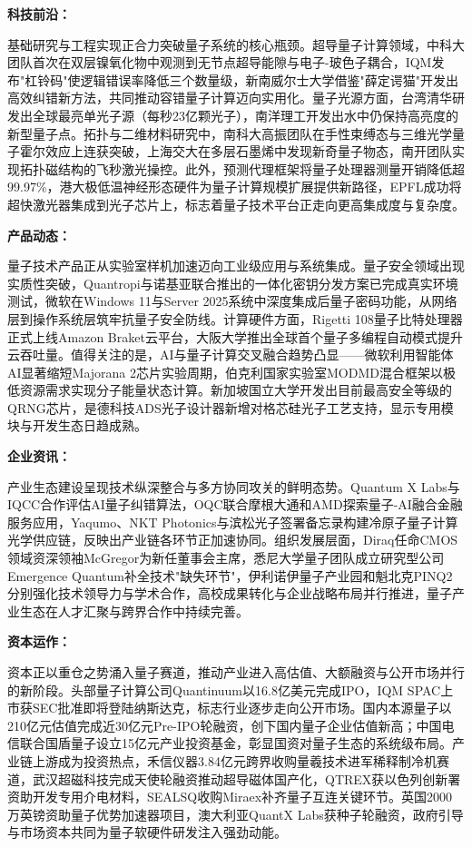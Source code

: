 \documentclass[12pt,a4paper]{ctexart}
\begin{document}
\textbf{ 科技前沿：}

基础研究与工程实现正合力突破量子系统的核心瓶颈。超导量子计算领域，中科大团队首次在双层镍氧化物中观测到无节点超导能隙与电子-玻色子耦合，IQM发布"杠铃码"使逻辑错误率降低三个数量级，新南威尔士大学借鉴"薛定谔猫"开发出高效纠错新方法，共同推动容错量子计算迈向实用化。量子光源方面，台湾清华研发出全球最亮单光子源（每秒23亿颗光子），南洋理工开发出水中仍保持高亮度的新型量子点。拓扑与二维材料研究中，南科大高振团队在手性束缚态与三维光学量子霍尔效应上连获突破，上海交大在多层石墨烯中发现新奇量子物态，南开团队实现拓扑磁结构的飞秒激光操控。此外，预测代理框架将量子处理器测量开销降低超99.97\%，港大极低温神经形态硬件为量子计算规模扩展提供新路径，EPFL成功将超快激光器集成到光子芯片上，标志着量子技术平台正走向更高集成度与复杂度。


\textbf{ 产品动态：}

量子技术产品正从实验室样机加速迈向工业级应用与系统集成。量子安全领域出现实质性突破，Quantropi与诺基亚联合推出的一体化密钥分发方案已完成真实环境测试，微软在Windows 11与Server 2025系统中深度集成后量子密码功能，从网络层到操作系统层筑牢抗量子安全防线。计算硬件方面，Rigetti 108量子比特处理器正式上线Amazon Braket云平台，大阪大学推出全球首个量子多编程自动模式提升云吞吐量。值得关注的是，AI与量子计算交叉融合趋势凸显——微软利用智能体AI显著缩短Majorana 2芯片实验周期，伯克利国家实验室MODMD混合框架以极低资源需求实现分子能量状态计算。新加坡国立大学开发出目前最高安全等级的QRNG芯片，是德科技ADS光子设计器新增对格芯硅光子工艺支持，显示专用模块与开发生态日趋成熟。


\textbf{ 企业资讯：}

产业生态建设呈现技术纵深整合与多方协同攻关的鲜明态势。Quantum X Labs与IQCC合作评估AI量子纠错算法，OQC联合摩根大通和AMD探索量子-AI融合金融服务应用，Yaqumo、NKT Photonics与滨松光子签署备忘录构建冷原子量子计算光学供应链，反映出产业链各环节正加速协同。组织发展层面，Diraq任命CMOS领域资深领袖McGregor为新任董事会主席，悉尼大学量子团队成立研究型公司Emergence Quantum补全技术"缺失环节"，伊利诺伊量子产业园和魁北克PINQ2分别强化技术领导力与学术合作，高校成果转化与企业战略布局并行推进，量子产业生态在人才汇聚与跨界合作中持续完善。


\textbf{ 资本运作：}

资本正以重仓之势涌入量子赛道，推动产业进入高估值、大额融资与公开市场并行的新阶段。头部量子计算公司Quantinuum以16.8亿美元完成IPO，IQM SPAC上市获SEC批准即将登陆纳斯达克，标志行业逐步走向公开市场。国内本源量子以210亿元估值完成近30亿元Pre-IPO轮融资，创下国内量子企业估值新高；中国电信联合国盾量子设立15亿元产业投资基金，彰显国资对量子生态的系统级布局。产业链上游成为投资热点，禾信仪器3.84亿元跨界收购量羲技术进军稀释制冷机赛道，武汉超磁科技完成天使轮融资推动超导磁体国产化，QTREX获以色列创新署资助开发专用介电材料，SEALSQ收购Miraex补齐量子互连关键环节。英国2000万英镑资助量子优势加速器项目，澳大利亚QuantX Labs获种子轮融资，政府引导与市场资本共同为量子软硬件研发注入强劲动能。
\end{document}

